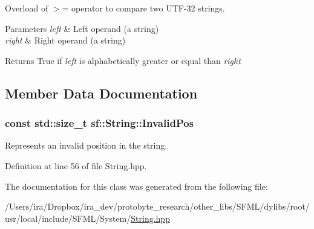 Overload of $>$= operator to compare two U\-T\-F-\/32 strings. 


\begin{DoxyParams}{Parameters}
{\em left} & Left operand (a string) \\
\hline
{\em right} & Right operand (a string)\\
\hline
\end{DoxyParams}
\begin{DoxyReturn}{Returns}
True if {\itshape left} is alphabetically greater or equal than {\itshape right} 
\end{DoxyReturn}


\subsection{Member Data Documentation}
\hypertarget{classsf_1_1_string_abaadecaf12a6b41c54d725c75fd28527}{
\subsubsection[{Invalid\-Pos}]{\setlength{\rightskip}{0pt plus 5cm}const std\-::size\-\_\-t sf\-::\-String\-::\-Invalid\-Pos\hspace{0.3cm}{\ttfamily [static]}}}\label{classsf_1_1_string_abaadecaf12a6b41c54d725c75fd28527}


Represents an invalid position in the string. 



Definition at line 56 of file String.\-hpp.



The documentation for this class was generated from the following file\-:\begin{DoxyCompactItemize}
\item 
/\-Users/ira/\-Dropbox/ira\-\_\-dev/protobyte\-\_\-research/other\-\_\-libs/\-S\-F\-M\-L/dylibs/root/usr/local/include/\-S\-F\-M\-L/\-System/\hyperlink{_string_8hpp}{String.\-hpp}\end{DoxyCompactItemize}
